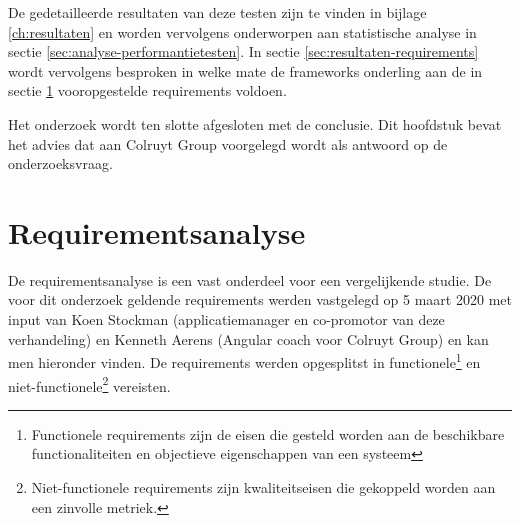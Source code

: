 

De gedetailleerde resultaten van deze testen zijn te vinden in bijlage \ref{ch:resultaten} en worden vervolgens onderworpen aan statistische analyse in sectie \ref{sec:analyse-performantietesten}. In sectie \ref{sec:resultaten-requirements} wordt vervolgens besproken in welke mate de frameworks onderling aan de in sectie \ref{sec:meth-requirements} vooropgestelde requirements voldoen.

Het onderzoek wordt ten slotte afgesloten met de conclusie. Dit hoofdstuk bevat het advies dat aan Colruyt Group voorgelegd wordt als antwoord op de onderzoeksvraag.

\section{Requirementsanalyse}
\label{sec:meth-requirements}

De requirementsanalyse is een vast onderdeel voor een vergelijkende studie. De voor dit onderzoek geldende requirements werden vastgelegd op 5 maart 2020 met input van Koen Stockman (applicatiemanager en co-promotor van deze verhandeling) en Kenneth Aerens (Angular coach voor Colruyt Group) en kan men hieronder vinden. De requirements werden opgesplitst in functionele\footnote{Functionele requirements zijn de eisen die gesteld worden aan de beschikbare functionaliteiten en objectieve eigenschappen van een systeem} en niet-functionele\footnote{Niet-functionele requirements zijn kwaliteitseisen die gekoppeld worden aan een zinvolle metriek.} vereisten.

